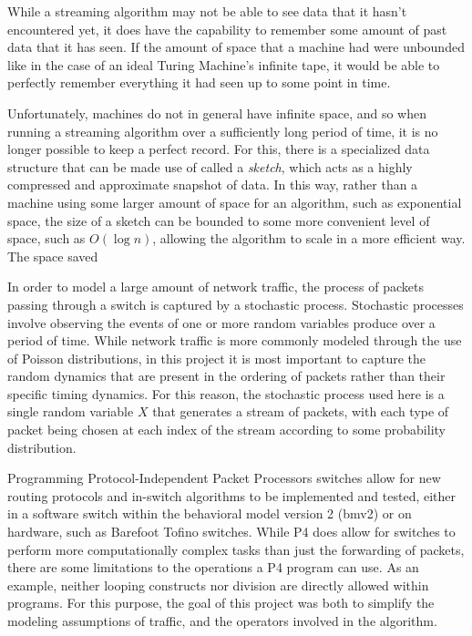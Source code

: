 \documentclass[conference]{IEEEtran}
\begin{document}
While a streaming algorithm may not be able to see data that it hasn't encountered yet, it does have the capability to remember some amount of past data that it has seen.  If the amount of space that a machine had were unbounded like in the case of an ideal Turing Machine's infinite tape, it would be able to perfectly remember everything it had seen up to some point in time.

Unfortunately, machines do not in general have infinite space, and so when running a streaming algorithm over a sufficiently long period of time, it is no longer possible to keep a perfect record.  For this, there is a specialized data structure that can be made use of called a \textit{sketch}, which acts as a highly compressed and approximate snapshot of data.  In this way, rather than a machine using some larger amount of space for an algorithm, such as exponential space, the size of a sketch can be bounded to some more convenient level of space, such as $O(\log n)$, allowing the algorithm to scale in a more efficient way.  The space saved

In order to model a large amount of network traffic, the process of packets passing through a switch is captured by a stochastic process.  Stochastic processes involve observing the events of one or more random variables produce over a period of time.  While network traffic is more commonly modeled through the use of Poisson distributions, in this project it is most important to capture the random dynamics that are present in the ordering of packets rather than their specific timing dynamics.  For this reason, the stochastic process used here is a single random variable $X$ that generates a stream of packets, with each type of packet being chosen at each index of the stream according to some probability distribution. 

Programming Protocol-Independent Packet Processors\cite{p4} switches allow for new routing protocols and in-switch algorithms to be implemented and tested, either in a software switch within the behavioral model version 2 (bmv2) or on hardware, such as Barefoot Tofino switches.  While P4 does allow for switches to perform more computationally complex tasks than just the forwarding of packets, there are some limitations to the operations a P4 program can use.  As an example, neither looping constructs nor division are directly allowed within programs.  For this purpose, the goal of this project was both to simplify the modeling assumptions of traffic, and the operators involved in the algorithm.
\end{document}
